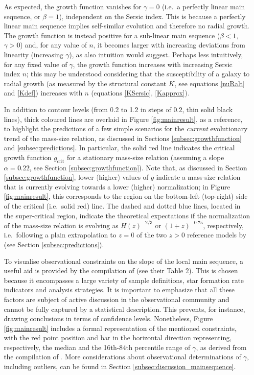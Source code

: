 \documentclass[fleqn,usenatbib]{mnras}
\begin{document}
As expected, the growth function vanishes for $\gamma=0$ (i.e.\ a perfectly linear main sequence, or $\beta = 1$), independent on the Sersic index. This is because a perfectly linear main sequence implies self-similar evolution and therefore no radial growth. The growth function is instead positive for a sub-linear main sequence ($\beta<1$, $\gamma > 0$) and, for any value of $n$, it becomes larger with increasing deviations from linearity (increasing $\gamma$), as also intuition would suggest. Perhaps less intuitively, for any fixed value of $\gamma$, the growth function increases with increasing Sersic index $n$; this may be understood considering that the susceptibility of a galaxy to radial growth (as measured by the structural constant $K$, see equations \ref{nuRalt} and \ref{Kdef}) increases with $n$ (equations \ref{KSersic}, \ref{Kapprox}).

In addition to contour levels (from 0.2 to 1.2 in steps of 0.2, thin solid black lines), thick coloured lines are overlaid in Figure \ref{fig:mainresult}, as a reference, to highlight the predictions of a few simple scenarios for the \emph{current} evolutionary trend of the mass-size relation, as discussed in Sections \ref{subsec:growthfunction} and \ref{subsec:predictions}. In particular, the solid red line indicates the critical growth function $g_\textrm{crit}$ for a stationary mass-size relation (assuming a slope $\alpha = 0.22$, see Section \ref{subsec:growthfunction}). Note that, as discussed in Section \ref{subsec:growthfunction}, lower (higher) values of $g$ indicate a mass-size relation that is currently evolving towards a lower (higher) normalization; in Figure \ref{fig:mainresult}, this corresponds to the region on the bottom-left (top-right) side of the critical (i.e.\ solid red) line. The dashed and dotted blue lines, located in the super-critical region, indicate the theoretical expectations if the normalization of the mass-size relation is evolving as $H(z)^{-2/3}$ or $(1+z)^{-0.75}$, respectively, i.e.\ following a plain extrapolation to $z= 0$ of the two $z>0$ reference models by \cite{vdW+14} (see Section \ref{subsec:predictions}).

To visualise observational constraints on the slope of the local main sequence, a useful aid is provided by the compilation of \cite{Enia+20} (see their Table 2). This is chosen because it encompasses a large variety of sample definitions, star formation rate indicators and analysis strategies. It is important to emphasize that all these factors are subject of active discussion in the observational community and cannot be fully captured by a statistical description. This prevents, for instance, drawing conclusions in terms of confidence levels. Nonetheless, Figure \ref{fig:mainresult} includes a formal representation of the mentioned constraints, with the red point position and bar in the horizontal direction representing, respectively, the median and the 16th-84th percentile range of $\gamma$, as derived from the compilation of \cite{Enia+20}. More considerations about observational determinations of $\gamma$, including outliers, can be found in Section \ref{subsec:discussion_mainsequence}. 
\end{document}
